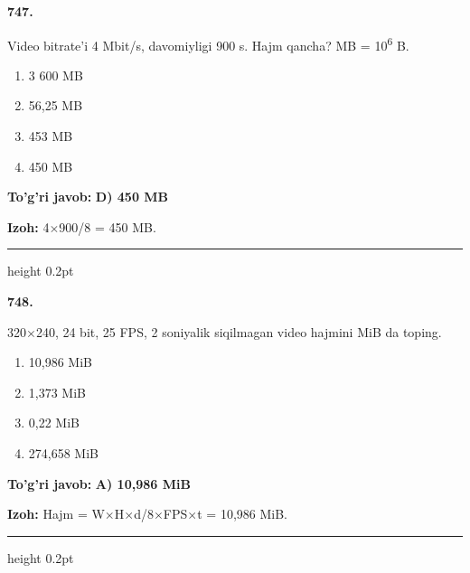 \documentclass[10pt,a4paper,oneside]{article}
\begin{document}
\noindent\textbf{\color{ink}747.}
\par
Video bitrate'i 4 Mbit/s, davomiyligi 900 s. Hajm qancha? MB = 10\textsuperscript{6} B.
\begin{enumerate}[label=\Alph*),leftmargin=9mm]
\item 3 600 MB
\item 56,25 MB
\item 453 MB
\item 450 MB
\end{enumerate}
\begin{tcolorbox}[enhanced,breakable,colback=teal!4,colframe=teal!50!black,boxrule=0.5pt,arc=1.1mm,left=3mm,right=3mm,top=1.7mm,bottom=1.7mm,before skip=2mm,after skip=2mm]
\textbf{\color{teal}To'g'ri javob:} \textbf{D) 450 MB}
\par\smallskip
\textbf{Izoh:} 4\ensuremath{\times}900/8 = 450 MB.
\end{tcolorbox}
\vspace{2mm}\hrule height 0.2pt \vspace{3mm}

\noindent\textbf{\color{ink}748.}
\par
320\ensuremath{\times}240, 24 bit, 25 FPS, 2 soniyalik siqilmagan video hajmini MiB da toping.
\begin{enumerate}[label=\Alph*),leftmargin=9mm]
\item 10,986 MiB
\item 1,373 MiB
\item 0,22 MiB
\item 274,658 MiB
\end{enumerate}
\begin{tcolorbox}[enhanced,breakable,colback=teal!4,colframe=teal!50!black,boxrule=0.5pt,arc=1.1mm,left=3mm,right=3mm,top=1.7mm,bottom=1.7mm,before skip=2mm,after skip=2mm]
\textbf{\color{teal}To'g'ri javob:} \textbf{A) 10,986 MiB}
\par\smallskip
\textbf{Izoh:} Hajm = W\ensuremath{\times}H\ensuremath{\times}d/8\ensuremath{\times}FPS\ensuremath{\times}t = 10,986 MiB.
\end{tcolorbox}
\vspace{2mm}\hrule height 0.2pt \vspace{3mm}
\end{document}
